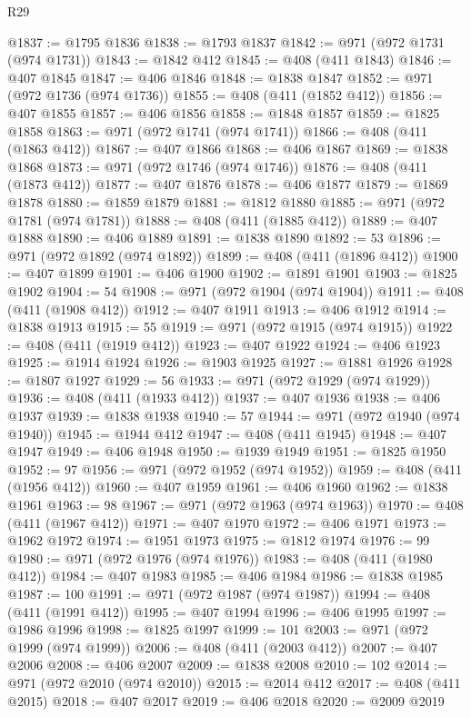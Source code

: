 \begin{lexlean}{R29}
\begin{coremodule}
@1837 := @1795 @1836
@1838 := @1793 @1837
@1842 := @971 (@972 @1731 (@974 @1731))
@1843 := @1842 @412
@1845 := @408 (@411 @1843)
@1846 := @407 @1845
@1847 := @406 @1846
@1848 := @1838 @1847
@1852 := @971 (@972 @1736 (@974 @1736))
@1855 := @408 (@411 (@1852 @412))
@1856 := @407 @1855
@1857 := @406 @1856
@1858 := @1848 @1857
@1859 := @1825 @1858
@1863 := @971 (@972 @1741 (@974 @1741))
@1866 := @408 (@411 (@1863 @412))
@1867 := @407 @1866
@1868 := @406 @1867
@1869 := @1838 @1868
@1873 := @971 (@972 @1746 (@974 @1746))
@1876 := @408 (@411 (@1873 @412))
@1877 := @407 @1876
@1878 := @406 @1877
@1879 := @1869 @1878
@1880 := @1859 @1879
@1881 := @1812 @1880
@1885 := @971 (@972 @1781 (@974 @1781))
@1888 := @408 (@411 (@1885 @412))
@1889 := @407 @1888
@1890 := @406 @1889
@1891 := @1838 @1890
@1892 := 53
@1896 := @971 (@972 @1892 (@974 @1892))
@1899 := @408 (@411 (@1896 @412))
@1900 := @407 @1899
@1901 := @406 @1900
@1902 := @1891 @1901
@1903 := @1825 @1902
@1904 := 54
@1908 := @971 (@972 @1904 (@974 @1904))
@1911 := @408 (@411 (@1908 @412))
@1912 := @407 @1911
@1913 := @406 @1912
@1914 := @1838 @1913
@1915 := 55
@1919 := @971 (@972 @1915 (@974 @1915))
@1922 := @408 (@411 (@1919 @412))
@1923 := @407 @1922
@1924 := @406 @1923
@1925 := @1914 @1924
@1926 := @1903 @1925
@1927 := @1881 @1926
@1928 := @1807 @1927
@1929 := 56
@1933 := @971 (@972 @1929 (@974 @1929))
@1936 := @408 (@411 (@1933 @412))
@1937 := @407 @1936
@1938 := @406 @1937
@1939 := @1838 @1938
@1940 := 57
@1944 := @971 (@972 @1940 (@974 @1940))
@1945 := @1944 @412
@1947 := @408 (@411 @1945)
@1948 := @407 @1947
@1949 := @406 @1948
@1950 := @1939 @1949
@1951 := @1825 @1950
@1952 := 97
@1956 := @971 (@972 @1952 (@974 @1952))
@1959 := @408 (@411 (@1956 @412))
@1960 := @407 @1959
@1961 := @406 @1960
@1962 := @1838 @1961
@1963 := 98
@1967 := @971 (@972 @1963 (@974 @1963))
@1970 := @408 (@411 (@1967 @412))
@1971 := @407 @1970
@1972 := @406 @1971
@1973 := @1962 @1972
@1974 := @1951 @1973
@1975 := @1812 @1974
@1976 := 99
@1980 := @971 (@972 @1976 (@974 @1976))
@1983 := @408 (@411 (@1980 @412))
@1984 := @407 @1983
@1985 := @406 @1984
@1986 := @1838 @1985
@1987 := 100
@1991 := @971 (@972 @1987 (@974 @1987))
@1994 := @408 (@411 (@1991 @412))
@1995 := @407 @1994
@1996 := @406 @1995
@1997 := @1986 @1996
@1998 := @1825 @1997
@1999 := 101
@2003 := @971 (@972 @1999 (@974 @1999))
@2006 := @408 (@411 (@2003 @412))
@2007 := @407 @2006
@2008 := @406 @2007
@2009 := @1838 @2008
@2010 := 102
@2014 := @971 (@972 @2010 (@974 @2010))
@2015 := @2014 @412
@2017 := @408 (@411 @2015)
@2018 := @407 @2017
@2019 := @406 @2018
@2020 := @2009 @2019

\end{coremodule}
\end{lexlean}
